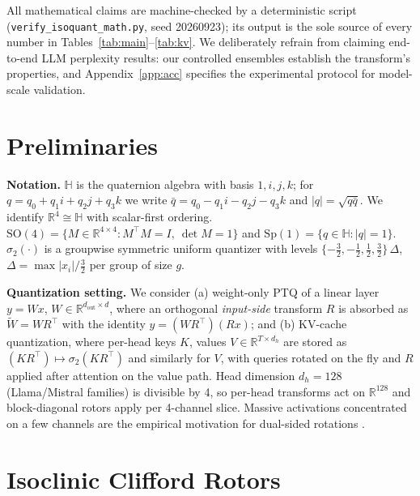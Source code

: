 \documentclass{article}
\newcommand{\R}{\mathbb{R}}
\newcommand{\SO}{\mathrm{SO}}
\newcommand{\Sp}{\mathrm{Sp}}
\begin{document}
All mathematical claims are machine-checked by a deterministic script
(\texttt{verify\_isoquant\_math.py}, seed 20260923); its output is the sole
source of every number in Tables~\ref{tab:main}--\ref{tab:kv}. We deliberately
refrain from claiming end-to-end LLM perplexity results: our controlled
ensembles establish the transform's properties, and Appendix~\ref{app:acc}
specifies the experimental protocol for model-scale validation.

\section{Preliminaries}
\label{sec:prelim}

\textbf{Notation.} $\mathbb{H}$ is the quaternion algebra with basis
$1,i,j,k$; for $q=q_0+q_1i+q_2j+q_3k$ we write
$\bar q=q_0-q_1i-q_2j-q_3k$ and $|q|=\sqrt{q\bar q}$. We identify
$\R^4\cong\mathbb{H}$ with scalar-first ordering. $\SO(4)=\{M\in\R^{4\times4}:
M^\top M=I,\ \det M=1\}$ and $\Sp(1)=\{q\in\mathbb{H}:|q|=1\}$.
$\sigma_2(\cdot)$ is a groupwise symmetric uniform quantizer with levels
$\{-\tfrac32,-\tfrac12,\tfrac12,\tfrac32\}\,\Delta$,
$\Delta=\max|x_i|/\tfrac32$ per group of size $g$.

\textbf{Quantization setting.} We consider (a) weight-only PTQ of a linear
layer $y=Wx$, $W\in\R^{d_{\text{out}}\times d}$, where an orthogonal
\emph{input-side} transform $R$ is absorbed as $\tilde W=WR^\top$ with the
identity $y=(WR^\top)(Rx)$; and (b) KV-cache quantization, where per-head keys
$K$, values $V\in\R^{T\times d_h}$ are stored as
$(KR^\top)\mapsto\sigma_2(KR^\top)$ and similarly for $V$, with queries
rotated on the fly and $R$ applied after attention on the value path. Head
dimension $d_h=128$ (Llama/Mistral families) is divisible by 4, so per-head
transforms act on $\R^{128}$ and block-diagonal rotors apply per 4-channel
slice. Massive activations concentrated on a few channels
\citep{sun2024massive} are the empirical motivation for dual-sided rotations
\citep{su2025rotatekv}.

\section{Isoclinic Clifford Rotors}
\label{sec:rotors}
\end{document}
